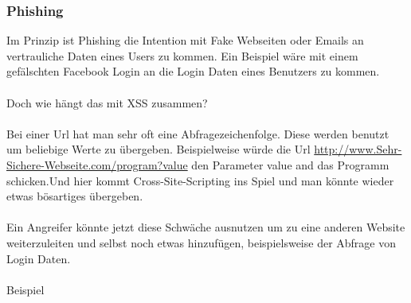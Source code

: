 \subsubsection{Phishing}
Im Prinzip ist Phishing die Intention mit Fake Webseiten oder Emails an vertrauliche Daten eines Users zu kommen. Ein Beispiel wäre mit einem gefälschten Facebook Login an die Login Daten eines Benutzers zu kommen. 
\\ \\Doch wie hängt das mit XSS zusammen?\\ \\Bei einer Url hat man sehr oft eine Abfragezeichenfolge. Diese werden benutzt um beliebige Werte zu übergeben. Beispielweise würde die Url 
\url{ http://www.Sehr-Sichere-Webseite.com/program?value} den Parameter value and das Programm schicken.Und hier kommt Cross-Site-Scripting ins Spiel und man könnte wieder etwas bösartiges übergeben.\\ \\Ein Angreifer könnte jetzt diese Schwäche ausnutzen um zu eine anderen Website weiterzuleiten und selbst noch etwas hinzufügen, beispielsweise der Abfrage von Login Daten. \\ \\Beispiel\\ \\
